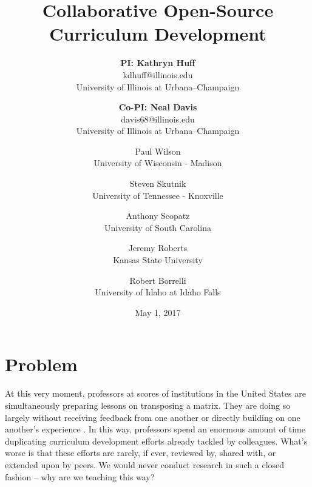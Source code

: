 \documentclass[11pt]{article}
\newcommand{\authorsite}{arfc.npre.illinois.edu}
\begin{document}
          \date{May 1, 2017}
          \title{Collaborative Open-Source Curriculum Development}
          \author{\textbf{PI: Kathryn Huff}\\%
                  kdhuff@illinois.edu\\
                  University of Illinois at Urbana--Champaign
                  \and
           \textbf{Co-PI: Neal Davis}\\
                  davis68@illinois.edu\\
                   University of Illinois at Urbana--Champaign
                  \and
           Paul Wilson\\
                  University of Wisconsin - Madison 
                  \and
          Steven Skutnik\\
                  University of Tennessee - Knoxville
                  \and
          Anthony Scopatz\\
                  University of South Carolina 
                  \and
          Jeremy Roberts\\
                  Kansas State University 
                  \and
          Robert Borrelli\\
                  University of Idaho at Idaho Falls
          }
          \maketitle

          \pagestyle{fancy}
          \lhead{\textcolor{gray}{SIIP Full Proposal}}
          \rhead{\textcolor{gray}{Collaborative Open-Source Curriculum Development}}
          \renewcommand{\headrulewidth}{0pt}
          \renewcommand{\footrulewidth}{0pt}

          \section{Problem}
          At this very moment, professors at scores of institutions in the United States are 
          simultaneously preparing lessons on transposing a matrix.
          They are doing so largely without receiving feedback from one another 
          or directly building on one another's experience 
          \cite{green_building_2014}. In this way, 
          professors spend an enormous amount of time duplicating curriculum 
          development efforts already tackled by colleagues. What's worse is 
          that these efforts are rarely, if ever, reviewed by, shared with, or 
          extended upon by peers. We would never conduct research in such a 
          closed fashion -- why are we teaching this way?
          
\end{document}
